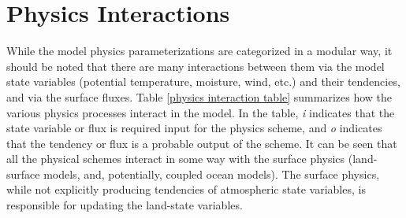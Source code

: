 \section {Physics Interactions}

While the model physics parameterizations are categorized in a modular way,
it should be noted that there are many interactions between them via the
model state variables (potential temperature, moisture, wind, etc.)
and their tendencies, and via the surface fluxes.
Table \ref {physics interaction table} summarizes how the various physics
processes interact in the model. In the table, {\em i} indicates that the 
state variable or flux is required input for the physics scheme, and {\em o}
indicates that the tendency or flux is a probable output of the scheme.
It can be seen that all the physical schemes interact in some way with the surface
physics (land-surface models, and, potentially, coupled ocean models).
The surface physics, while not explicitly producing tendencies of atmospheric
state variables, is responsible for updating the land-state variables.

